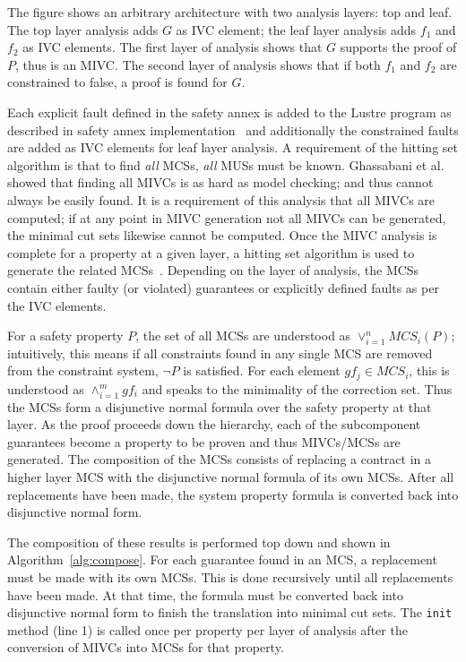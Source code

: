 The figure shows an arbitrary architecture with two analysis layers: top and leaf. The top layer analysis adds $G$ as IVC element; the leaf layer analysis adds $f_1$ and $f_2$ as IVC elements. The first layer of analysis shows that $G$ supports the proof of $P$, thus is an MIVC. The second layer of analysis shows that if both $f_1$ and $f_2$ are constrained to false, a proof is found for $G$. 

Each explicit fault defined in the safety annex is added to the Lustre program as described in safety annex implementation~\cite{Stewart17:IMBSA,stewart2020safety} and additionally the constrained faults are added as IVC elements for leaf layer analysis. A requirement of the hitting set algorithm is that to find \emph{all} MCSs, \emph{all} MUSs must be known. Ghassabani et al.~\cite{Ghassabani2017EfficientGO} showed that finding all MIVCs is as hard as model checking; and thus cannot always be easily found. It is a requirement of this analysis that all MIVCs are computed; if at any point in MIVC generation not all MIVCs can be generated, the minimal cut sets likewise cannot be computed. Once the MIVC analysis is complete for a property at a given layer, a hitting set algorithm is used to generate the related MCSs~\cite{gainer2017minimal}. Depending on the layer of analysis, the MCSs contain either faulty (or violated) guarantees or explicitly defined faults as per the IVC elements.

For a safety property $P$, the set of all MCSs are understood as $\lor^{n}_{i=1} MCS_i(P)$; intuitively, this means if all constraints found in any single MCS are removed from the constraint system, $\neg P$ is satisfied. For each element $gf_j \in MCS_i$, this is understood as $\land^{m}_{i=1} gf_i$ and speaks to the minimality of the correction set. Thus the MCSs form a disjunctive normal formula over the safety property at that layer. As the proof proceeds down the hierarchy, each of the subcomponent guarantees become a property to be proven and thus MIVCs/MCSs are generated. The composition of the MCSs consists of replacing a contract in a higher layer MCS with the disjunctive normal formula of its own MCSs. After all replacements have been made, the system property formula is converted back into disjunctive normal form. 

The composition of these results is performed top down and shown in Algorithm~\ref{alg:compose}. For each guarantee found in an MCS, a replacement must be made with its own MCSs. This is done recursively until all replacements have been made. At that time, the formula must be converted back into disjunctive normal form to finish the translation into minimal cut sets. The \texttt{init} method (line 1) is called once per property per layer of analysis after the conversion of MIVCs into MCSs for that property.

